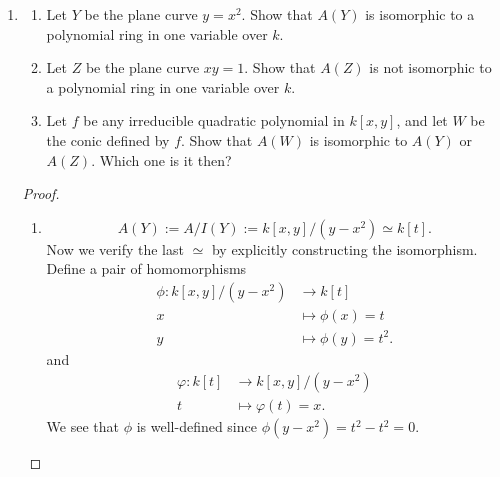 
\begin{enumerate}
	\item [1.1]
		\begin{enumerate}
			\item Let $Y$ be the plane curve $y = x^2$. Show that $A(Y)$ is isomorphic to a polynomial ring in one variable over $k$.
			\item Let $Z$ be the plane curve $xy = 1$. Show that $A\left(Z\right) $ is not isomorphic to a polynomial ring in one variable over $k$.
			\item Let $f$ be any irreducible quadratic polynomial in $k[x,y]$, and let $W $ be the conic defined by $f$. Show that $A(W)$ is isomorphic to $A(Y)$ or $A\left( Z \right) $. Which one is it then?
		\end{enumerate}
		\begin{proof}
			\begin{enumerate}
				\item 
					\[
						A(Y) := A / I(Y) := k[x,y] / (y - x^2) \simeq k[t]
					.\] 
					Now we verify the last $\simeq $ by explicitly constructing the isomorphism. Define a pair of homomorphisms
					\begin{align*}
						\phi: k[x,y]/(y-x^2) &\longrightarrow k[t] \\
						x &\longmapsto \phi(x) = t \\
						y &\longmapsto \phi(y) = t^2
					.\end{align*}
					and
					\begin{align*}
						\varphi: k[t] &\longrightarrow k[x,y]/(y-x^2) \\
						t &\longmapsto \varphi(t) = x
					.\end{align*}
					We see that $\phi$ is well-defined since $\phi(y - x^2) = t^2 - t^2 = 0$. 


\end{enumerate}
\end{proof}
\end{enumerate}
